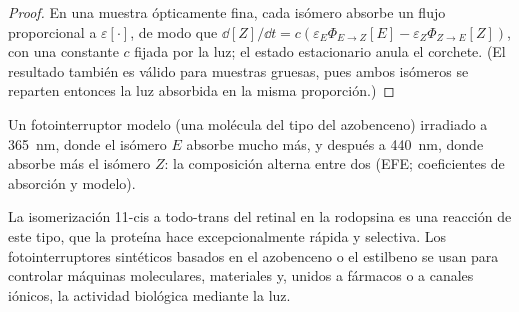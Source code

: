 \begin{proof}
En una muestra ópticamente fina, cada isómero absorbe un flujo proporcional a $\varepsilon[\cdot]$, de modo que
$\dd[Z]/\dd t = c(\varepsilon_E\Phi_{E\to Z}[E] - \varepsilon_Z\Phi_{Z\to E}[Z])$, con una constante $c$ fijada por la luz;
el estado estacionario anula el corchete. (El resultado también es válido para muestras
gruesas, pues ambos isómeros se reparten entonces la luz absorbida en la misma proporción.)
\end{proof}

\begin{omfigure}

{\small Un fotointerruptor modelo (una molécula del tipo del azobenceno) irradiado a \qty{365}{nm}, donde
el isómero $E$ absorbe mucho más, y después a \qty{440}{nm}, donde absorbe más el isómero $Z$:
la composición alterna entre dos  (EFE; coeficientes de
absorción y  modelo).}
\end{omfigure}

La isomerización 11-cis a todo-trans del retinal en la rodopsina es una
reacción de este tipo, que la proteína hace excepcionalmente rápida y selectiva. Los
fotointerruptores sintéticos basados en el azobenceno o el estilbeno se usan para controlar máquinas
moleculares, materiales y, unidos a fármacos o a canales iónicos, la actividad
biológica mediante la luz.

